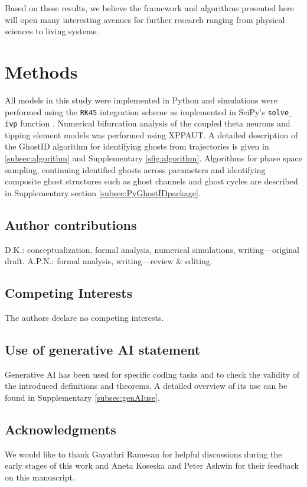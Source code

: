 \documentclass{article}
\theoremstyle{definition}
\begin{document}
\begin{refsection}
Based on these results, we believe the framework and algorithms presented here will open many interesting avenues for further research ranging from physical sciences to living systems.


\section{Methods}
All models in this study were implemented in Python and simulations were performed using the {\tt RK45} integration scheme as implemented in SciPy's {\tt solve$\_$ivp} function \cite{scipyref}. Numerical bifurcation analysis of the coupled theta neurons and tipping element models was performed using XPPAUT. A detailed description of the GhostID algorithm for identifying ghosts from trajectories is given in \autoref{subsec:algorithm} and Supplementary \autoref{sfig:algorithm}. Algorithms for phase space sampling, continuing identified ghosts across parameters and identifying composite ghost structures such as ghost channels and ghost cycles are described in Supplementary section \ref{subsec:PyGhostIDpackage}.

\subsection*{Author contributions}
\small{D.K.: conceptualization, formal analysis, numerical simulations, writing—original draft. A.P.N.: formal analysis, writing—review \& editing.}

\subsection*{Competing Interests}
\small{The authors declare no competing interests.}

\subsection*{Use of generative AI statement}
\small{Generative AI has been used for specific coding tasks and to check the validity of the introduced definitions and theorems. A detailed overview of its use can be found in Supplementary \autoref{subsec:genAIuse}.}

\subsection*{Acknowledgments}
\small{We would like to thank Gayathri Ramesan for helpful discussions during the early stages of this work and Aneta Koseska and Peter Ashwin for their feedback on this manuscript.}


\end{refsection}
\end{document}
